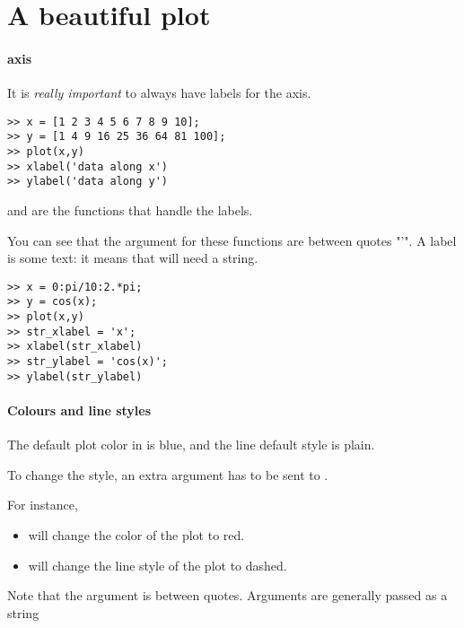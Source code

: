 





\section{A beautiful plot}

\paragraph{axis}
It is \emph{really important} to always have labels for the axis.

\begin{lstlisting}
>> x = [1 2 3 4 5 6 7 8 9 10];
>> y = [1 4 9 16 25 36 64 81 100];
>> plot(x,y)
>> xlabel('data along x')
>> ylabel('data along y')
\end{lstlisting}

 and  are the \matlab functions that handle the labels.

You can see that the argument for these functions are between quotes "'".
A label is some text: it means that \matlab will need a string.


\begin{lstlisting}
>> x = 0:pi/10:2.*pi;
>> y = cos(x);
>> plot(x,y)
>> str_xlabel = 'x';
>> xlabel(str_xlabel)
>> str_ylabel = 'cos(x)';
>> ylabel(str_ylabel)
\end{lstlisting}

\paragraph{Colours and line styles}
The default plot color in \matlab is blue, and the line default style is plain.



To change the style, an extra argument has to be sent to \matlab.

For instance, 
\begin{itemize}
	\item {} will change the color of the plot to red.
	\item {} will change the line style of the plot to dashed.
\end{itemize}
Note that the argument is between quotes.
Arguments are generally passed as a string


